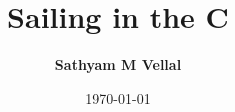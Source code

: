 \newlength\drop
\newcommand*{\titleGM}{%
\thispagestyle{empty}
\begingroup%
\drop = 0.1\textheight
\vspace*{\baselineskip}
\vfill
\hbox{%
\hspace*{0.2\textwidth}%
\rule{1pt}{\dimexpr\textheight-28pt\relax}%
\hspace*{0.05\textwidth}%
\parbox[b]{0.75\textwidth}{
\vbox{%
\vspace{\drop}
{\noindent\HUGE\bfseries Sailing in the C}\\[2\baselineskip]
{\Large\itshape A guide to the C Programming Language}\\[.37\baselineskip]
{\Large Sathyam M Vellal}\par
\vspace{0.5\textheight}
{\noindent }\\[\baselineskip]
}%
}%
}%
\vfill
\null
\endgroup}

\title{\Huge\textbf{Sailing in the C}}
\author{\Large\textbf{Sathyam M Vellal}}
\date{\Large{\today}}